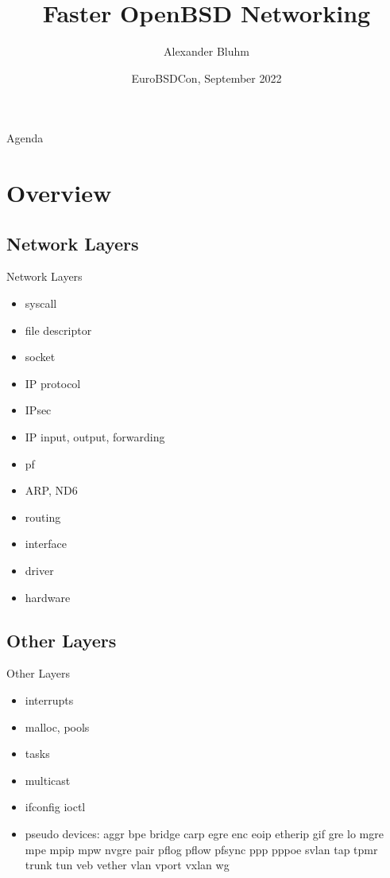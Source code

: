 \documentclass[14pt,aspectratio=169]{beamer}
\author{Alexander Bluhm}
\title{Faster OpenBSD Networking}
\institute{bluhm@openbsd.org}
\date{EuroBSDCon, September 2022}
\begin{document}
\begin{frame}
\titlepage
\end{frame}

\begin{frame}{Agenda}
\setcounter{tocdepth}{1}
\tableofcontents[currentsection]
\end{frame}

\section{Overview}

\subsection{Network Layers}
\begin{frame}{Network Layers}
\begin{itemize}
\item syscall
\item file descriptor
\item socket
\item IP protocol
\item IPsec
\item IP input, output, forwarding
\item pf
\item ARP, ND6
\item routing
\item interface
\item driver
\item hardware
\end{itemize}
\end{frame}

\subsection{Other Layers}
\begin{frame}{Other Layers}
\begin{itemize}
\item interrupts
\item malloc, pools
\item tasks
\item multicast
\item ifconfig ioctl
\item pseudo devices:
    aggr bpe bridge carp egre enc eoip etherip gif gre lo mgre mpe
    mpip mpw nvgre pair pflog pflow pfsync ppp pppoe svlan tap tpmr
    trunk tun veb vether vlan vport vxlan wg
\end{itemize}
\end{frame}
\end{document}
